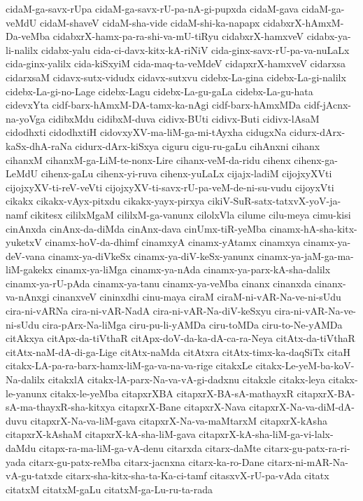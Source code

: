 {cidaM-ga-savx-rUpa
cidaM-ga-savx-rU-pa-nA-gi-pupxda
cidaM-gava
cidaM-ga-veMdU
cidaM-shaveV
cidaM-sha-vide
cidaM-shi-ka-napapx
cidabxrX-hAmxM-Da-veMba
cidabxrX-hamx-pa-ra-shi-va-mU-tiRyu
cidabxrX-hamxveV
cidabx-ya-li-nalilx
cidabx-yalu
cida-ci-davx-kitx-kA-riNiV
cida-ginx-savx-rU-pa-va-nuLaLx
cida-ginx-yalilx
cida-kiSxyiM
cida-maq-ta-veMdeV
cidapxrX-hamxveV
cidarxsa
cidarxsaM
cidavx-sutx-vidudx
cidavx-sutxvu
cidebx-La-gina
cidebx-La-gi-nalilx
cidebx-La-gi-no-Lage
cidebx-Lagu
cidebx-La-gu-gaLa
cidebx-La-gu-hata
cidevxYta
cidf-barx-hAmxM-DA-tamx-ka-nAgi
cidf-barx-hAmxMDa
cidf-jAcnx-na-yoVga
cidibxMdu
cidibxM-duva
cidivx-BUti
cidivx-Buti
cidivx-lAsaM
cidodhxti
cidodhxtiH
cidovxyXV-ma-liM-ga-mi-tAyxha
cidugxNa
cidurx-dArx-kaSx-dhA-raNa
cidurx-dArx-kiSxya
ciguru
cigu-ru-gaLu
cihAnxni
cihanx
cihanxM
cihanxM-ga-LiM-te-nonx-Lire
cihanx-veM-da-ridu
cihenx
cihenx-ga-LeMdU
cihenx-gaLu
cihenx-yi-ruva
cihenx-yuLaLx
cijajx-ladiM
cijojxyXVti
cijojxyXV-ti-reV-veVti
cijojxyXV-ti-savx-rU-pa-veM-de-ni-su-vudu
cijoyxVti
cikakx
cikakx-vAyx-pitxdu
cikakx-yayx-pirxya
cikiV-SuR-satx-tatxvX-yoV-ja-namf
cikitesx
cililxMgaM
cililxM-ga-vanunx
cilolxVla
cilume
cilu-meya
cimu-kisi
cinAnxda
cinAnx-da-diMda
cinAnx-dava
cinUmx-tiR-yeMba
cinamx-hA-sha-kitx-yuketxV
cinamx-hoV-da-dhimf
cinamxyA
cinamx-yAtamx
cinamxya
cinamx-ya-deV-vana
cinamx-ya-diVkeSx
cinamx-ya-diV-keSx-yanunx
cinamx-ya-jaM-ga-ma-liM-gakekx
cinamx-ya-liMga
cinamx-ya-nAda
cinamx-ya-parx-kA-sha-dalilx
cinamx-ya-rU-pAda
cinamx-ya-tanu
cinamx-ya-veMba
cinanx
cinanxda
cinanx-va-nAnxgi
cinanxveV
cininxdhi
cinu-maya
ciraM
ciraM-ni-vAR-Na-ve-ni-sUdu
cira-ni-vARNa
cira-ni-vAR-NadA
cira-ni-vAR-Na-diV-keSxyu
cira-ni-vAR-Na-ve-ni-sUdu
cira-pArx-Na-liMga
ciru-pu-li-yAMDa
ciru-toMDa
ciru-to-Ne-yAMDa
citAkxya
citApx-da-tiVthaR
citApx-doV-da-ka-dA-ca-ra-Neya
citAtx-da-tiVthaR
citAtx-naM-dA-di-ga-Lige
citAtx-naMda
citAtxra
citAtx-timx-ka-daqSiTx
citaH
citakx-LA-pa-ra-barx-hamx-liM-ga-va-na-va-rige
citakxLe
citakx-Le-yeM-ba-koV-Na-dalilx
citakxlA
citakx-lA-parx-Na-va-vA-gi-dadxnu
citakxle
citakx-leya
citakx-le-yanunx
citakx-le-yeMba
citapxrXBA
citapxrX-BA-sA-mathayxR
citapxrX-BA-sA-ma-thayxR-sha-kitxya
citapxrX-Bane
citapxrX-Nava
citapxrX-Na-va-diM-dA-duvu
citapxrX-Na-va-liM-gava
citapxrX-Na-va-maMtarxM
citapxrX-kAsha
citapxrX-kAshaM
citapxrX-kA-sha-liM-gava
citapxrX-kA-sha-liM-ga-vi-lalx-daMdu
citapx-ra-ma-liM-ga-vA-denu
citarxda
citarx-daMte
citarx-gu-patx-ra-ri-yada
citarx-gu-patx-reMba
citarx-jacnxna
citarx-ka-ro-Dane
citarx-ni-mAR-Na-vA-gu-tatxde
citarx-sha-kitx-sha-ta-Ka-ci-tamf
citasxvX-rU-pa-vAda
citatx
citatxM
citatxM-gaLu
citatxM-ga-Lu-ru-ta-rada
}
